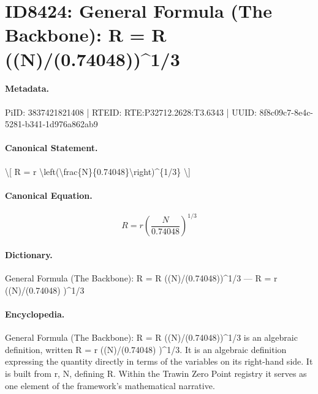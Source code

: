 \section*{ID8424: General Formula (The Backbone): R = R ((N)/(0.74048))\textasciicircum{}1/3}
\paragraph{Metadata.}
PiID: 3837421821408 | RTEID: RTE:P32712.2628:T3.6343 | UUID: 8f8c09c7-8e4c-5281-b341-1d976a862ab9

\paragraph{Canonical Statement.}
\textbackslash{}[ R = r \textbackslash{}left(\textbackslash{}frac\{N\}\{0.74048\}\textbackslash{}right)\textasciicircum{}\{1/3\} \textbackslash{}]

\paragraph{Canonical Equation.}
\[
R = r \left(\frac{N}{0.74048}\right)^{1/3}
\]

\paragraph{Dictionary.}
General Formula (The Backbone): R = R ((N)/(0.74048))\textasciicircum{}1/3 — R = r ((N)/(0.74048) )\textasciicircum{}1/3

\paragraph{Encyclopedia.}
General Formula (The Backbone): R = R ((N)/(0.74048))\textasciicircum{}1/3 is an algebraic definition, written R = r ((N)/(0.74048) )\textasciicircum{}1/3. It is an algebraic definition expressing the quantity directly in terms of the variables on its right-hand side. It is built from r, N, defining R. Within the Trawin Zero Point registry it serves as one element of the framework's mathematical narrative.
